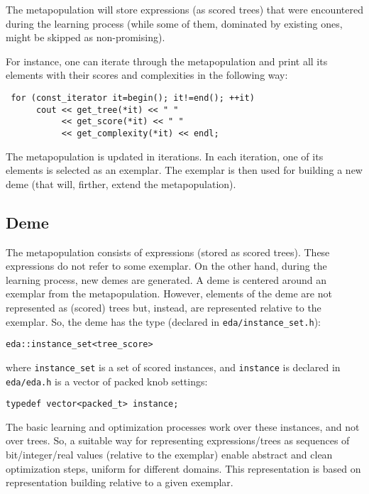 \documentclass{article}
\begin{document}
The metapopulation will store expressions (as scored trees) that were
encountered during the learning process (while some of them, dominated
by existing ones, might be skipped as non-promising). 

For instance, one can iterate through the metapopulation and print 
all its elements with their scores and complexities in the following way:

\begin{verbatim}
 for (const_iterator it=begin(); it!=end(); ++it)
      cout << get_tree(*it) << " " 
           << get_score(*it) << " " 
           << get_complexity(*it) << endl;
\end{verbatim}

The metapopulation is updated in iterations. In each iteration, one 
of its elements is selected as an exemplar. The exemplar is then
used for building a new deme (that will, firther, extend the metapopulation).


\subsection{Deme}

The metapopulation consists of expressions (stored as scored trees).
These expressions do not refer to some exemplar. On the other hand,
during the learning process, new demes are generated. 
A deme is centered around an exemplar from the metapopulation. 
However, elements of the deme are not represented as (scored) trees
but, instead, are represented relative to the exemplar. 
So, the deme has the type (declared in \verb|eda/instance_set.h|): 

\begin{verbatim}
eda::instance_set<tree_score>
\end{verbatim}

\noindent
where \verb|instance_set| is a set of scored instances, and \verb|instance|
is declared in \verb|eda/eda.h| is a vector of packed knob settings: 

\begin{verbatim}
typedef vector<packed_t> instance;
\end{verbatim}

The basic learning and optimization processes work over these instances,
and not over trees. So, a suitable way for representing expressions/trees 
as sequences of bit/integer/real values (relative to the exemplar) enable
abstract and clean optimization steps, uniform for different domains.
This representation is based on representation building relative to a
given exemplar.
\end{document}
